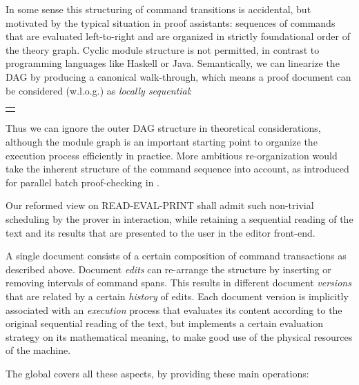 \begin{isabellebody}
\begin{isamarkuptext}
  In some sense this structuring of command transitions is accidental,
  but motivated by the typical situation in proof assistants:
  sequences of commands that are evaluated left-to-right and are
  organized in strictly foundational order of the theory graph.
  Cyclic module structure is not permitted, in contrast to programming
  languages like Haskell or Java.  Semantically, we can linearize the
  DAG by producing a canonical walk-through, which means a proof
  document can be considered (w.l.o.g.) as \emph{locally sequential}:

  \medskip
  \begin{tabular}{l}
  \isa{st\ {\isasymlongrightarrow}\isactrlsup t\isactrlsup r\ st{\isacharprime}\ {\isasymlongrightarrow}\isactrlsup t\isactrlsup r\isactrlsup {\isacharprime}\ st{\isacharprime}{\isacharprime}\ {\isasymdots}}
  \end{tabular}
  \medskip

  Thus we can ignore the outer DAG structure in theoretical
  considerations, although the module graph is an important starting
  point to organize the execution process efficiently in practice.
  More ambitious re-organization would take the inherent structure of
  the command sequence into account, as introduced for parallel batch
  proof-checking in \cite{Wenzel:2009,Matthews-Wenzel:2010}.

  Our reformed view on READ-EVAL-PRINT shall admit such non-trivial
  scheduling by the prover in interaction, while retaining a
  sequential reading of the text and its results that are presented to
  the user in the editor front-end.

   A single
  document consists of a certain composition of command transactions
  as described above.  Document \emph{edits} can re-arrange the
  structure by inserting or removing intervals of command spans.  This
  results in different document \emph{versions} that are related by a
  certain \emph{history} of edits.  Each document version is
  implicitly associated with an \emph{execution} process that
  evaluates its content according to the original sequential reading
  of the text, but implements a certain evaluation strategy on its
  mathematical meaning, to make good use of the physical resources of
  the machine.

  The global  covers all these aspects, by
  providing these main operations:


\end{isamarkuptext}
\end{isabellebody}
